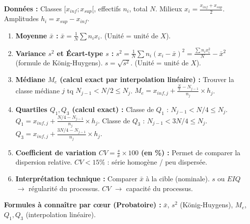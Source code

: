\documentclass[11pt]{article}
\begin{document}
\begin{methode}
    \textbf{Données :} Classes $[x_{inf}; x_{sup}[$, effectifs $n_i$, total $N$. Milieux $x_i = \frac{x_{inf}+x_{sup}}{2}$. Amplitudes $h_i = x_{sup} - x_{inf}$.
    \begin{enumerate}
        \item \textbf{Moyenne $\bar{x}$ :} $\bar{x} = \frac{1}{N}\sum n_i x_i$. (Unité = unité de $X$).
        \item \textbf{Variance $s^2$ et Écart-type $s$ :}
        $s^2 = \frac{1}{N}\sum n_i (x_i - \bar{x})^2 = \frac{\sum n_i x_i^2}{N} - \bar{x}^2$ (formule de König-Huygens).
        $s = \sqrt{s^2}$. (Unité = unité de $X$).
        \item \textbf{Médiane $M_e$ (calcul exact par interpolation linéaire) :}
        Trouver la classe médiane $j$ tq $N_{j-1} < N/2 \le N_j$.
        $M_e = x_{inf,j} + \frac{\frac{N}{2} - N_{j-1}}{n_j} \times h_j$.
        \item \textbf{Quartiles $Q_1, Q_3$ (calcul exact) :}
        Classe de $Q_1$ : $N_{j-1} < N/4 \le N_j$. $Q_1 = x_{inf,j} + \frac{N/4 - N_{j-1}}{n_j} \times h_j$.
        Classe de $Q_3$ : $N_{j-1} < 3N/4 \le N_j$. $Q_3 = x_{inf,j} + \frac{3N/4 - N_{j-1}}{n_j} \times h_j$.
        \item \textbf{Coefficient de variation $CV = \frac{s}{\bar{x}} \times 100$ (en \%) :} Permet de comparer la dispersion relative. $CV < 15\%$ : série homogène / peu dispersée.
        \item \textbf{Interprétation technique :} Comparer $\bar{x}$ à la cible (nominale). $s$ ou $EIQ$ $\rightarrow$ régularité du processus. $CV$ $\rightarrow$ capacité du processus.
    \end{enumerate}
    \textbf{Formules à connaître par cœur (Probatoire) :} $\bar{x}$, $s^2$ (König-Huygens), $M_e$, $Q_1, Q_3$ (interpolation linéaire).
\end{methode}
\end{document}

